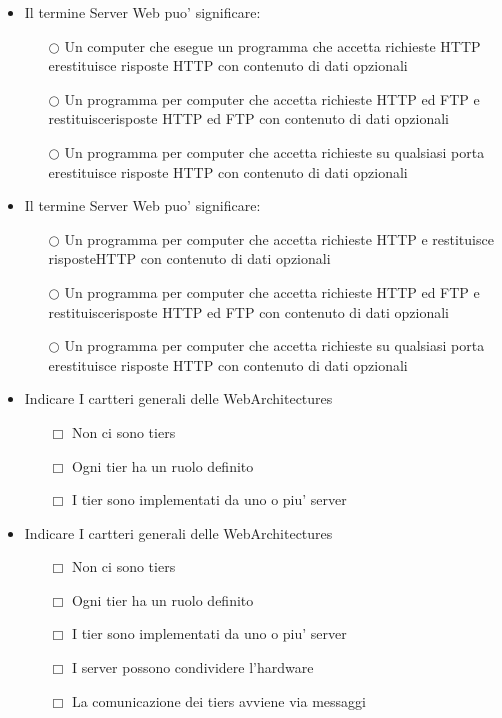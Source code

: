 \documentclass[10pt,twocolumn]{article}
\begin{document}
\begin{itemize}
    \item Il termine Server Web puo' significare:
          \begin{itemize}
              \item[$\bigcirc$] Un computer che esegue un programma che accetta richieste HTTP erestituisce risposte HTTP con contenuto di dati opzionali
              \item[$\bigcirc$] Un programma per computer che accetta richieste HTTP ed FTP e restituiscerisposte HTTP ed FTP con contenuto di dati opzionali
              \item[$\bigcirc$] Un programma per computer che accetta richieste su qualsiasi porta erestituisce risposte HTTP con contenuto di dati opzionali
          \end{itemize}
\end{itemize}
\begin{itemize}
    \item Il termine Server Web puo' significare:
          \begin{itemize}
              \item[$\bigcirc$] Un programma per computer che accetta richieste HTTP e restituisce risposteHTTP con contenuto di dati opzionali
              \item[$\bigcirc$] Un programma per computer che accetta richieste HTTP ed FTP e restituiscerisposte HTTP ed FTP con contenuto di dati opzionali
              \item[$\bigcirc$] Un programma per computer che accetta richieste su qualsiasi porta erestituisce risposte HTTP con contenuto di dati opzionali
          \end{itemize}
\end{itemize}
\begin{itemize}
    \item Indicare I cartteri generali delle WebArchitectures
          \begin{itemize}
              \item[$\Box$] Non ci sono tiers
              \item[$\Box$] Ogni tier ha un ruolo definito
              \item[$\Box$] I tier sono implementati da uno o piu' server
          \end{itemize}
\end{itemize}
\begin{itemize}
    \item Indicare I cartteri generali delle WebArchitectures
          \begin{itemize}
              \item[$\Box$] Non ci sono tiers
              \item[$\Box$] Ogni tier ha un ruolo definito
              \item[$\Box$] I tier sono implementati da uno o piu' server
              \item[$\Box$] I server possono condividere l'hardware
              \item[$\Box$] La comunicazione dei tiers avviene via messaggi
          \end{itemize}
\end{itemize}
\end{document}
